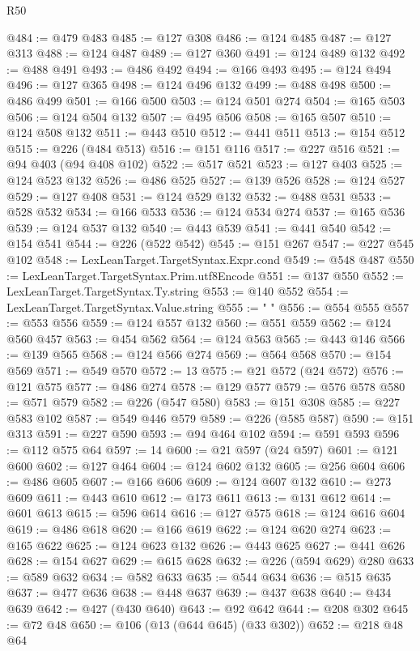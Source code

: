 \begin{lexlean}{R50}
\begin{coremodule}
{{{{{{{{{{{{{{{{{{{{{{{{{{{{{{{{{{{{{{{{{{{{{{{{{{{{{{{{{{{{@484 := @479 @483
@485 := @127 @308
@486 := @124 @485
@487 := @127 @313
@488 := @124 @487
@489 := @127 @360
@491 := @124 @489 @132
@492 := @488 @491
@493 := @486 @492
@494 := @166 @493
@495 := @124 @494
@496 := @127 @365
@498 := @124 @496 @132
@499 := @488 @498
@500 := @486 @499
@501 := @166 @500
@503 := @124 @501 @274
@504 := @165 @503
@506 := @124 @504 @132
@507 := @495 @506
@508 := @165 @507
@510 := @124 @508 @132
@511 := @443 @510
@512 := @441 @511
@513 := @154 @512
@515 := @226 (@484 @513)
@516 := @151 @116
@517 := @227 @516
@521 := @94 @403 (@94 @408 @102)
@522 := @517 @521
@523 := @127 @403
@525 := @124 @523 @132
@526 := @486 @525
@527 := @139 @526
@528 := @124 @527
@529 := @127 @408
@531 := @124 @529 @132
@532 := @488 @531
@533 := @528 @532
@534 := @166 @533
@536 := @124 @534 @274
@537 := @165 @536
@539 := @124 @537 @132
@540 := @443 @539
@541 := @441 @540
@542 := @154 @541
@544 := @226 (@522 @542)
@545 := @151 @267
@547 := @227 @545 @102
@548 := LexLeanTarget.TargetSyntax.Expr.cond
@549 := @548 @487
@550 := LexLeanTarget.TargetSyntax.Prim.utf8Encode
@551 := @137 @550
@552 := LexLeanTarget.TargetSyntax.Ty.string
@553 := @140 @552
@554 := LexLeanTarget.TargetSyntax.Value.string
@555 := " "
@556 := @554 @555
@557 := @553 @556
@559 := @124 @557 @132
@560 := @551 @559
@562 := @124 @560 @457
@563 := @454 @562
@564 := @124 @563
@565 := @443 @146
@566 := @139 @565
@568 := @124 @566 @274
@569 := @564 @568
@570 := @154 @569
@571 := @549 @570
@572 := 13
@575 := @21 @572 (@24 @572)
@576 := @121 @575
@577 := @486 @274
@578 := @129 @577
@579 := @576 @578
@580 := @571 @579
@582 := @226 (@547 @580)
@583 := @151 @308
@585 := @227 @583 @102
@587 := @549 @446 @579
@589 := @226 (@585 @587)
@590 := @151 @313
@591 := @227 @590
@593 := @94 @464 @102
@594 := @591 @593
@596 := @112 @575 @64
@597 := 14
@600 := @21 @597 (@24 @597)
@601 := @121 @600
@602 := @127 @464
@604 := @124 @602 @132
@605 := @256 @604
@606 := @486 @605
@607 := @166 @606
@609 := @124 @607 @132
@610 := @273 @609
@611 := @443 @610
@612 := @173 @611
@613 := @131 @612
@614 := @601 @613
@615 := @596 @614
@616 := @127 @575
@618 := @124 @616 @604
@619 := @486 @618
@620 := @166 @619
@622 := @124 @620 @274
@623 := @165 @622
@625 := @124 @623 @132
@626 := @443 @625
@627 := @441 @626
@628 := @154 @627
@629 := @615 @628
@632 := @226 (@594 @629) @280
@633 := @589 @632
@634 := @582 @633
@635 := @544 @634
@636 := @515 @635
@637 := @477 @636
@638 := @448 @637
@639 := @437 @638
@640 := @434 @639
@642 := @427 (@430 @640)
@643 := @92 @642
@644 := @208 @302
@645 := @72 @48
@650 := @106 (@13 (@644 @645) (@33 @302))
@652 := @218 @48 @64
}}}}}}}}}}}}}}}}}}}}}}}}}}}}}}}}}}}}}}}}}}}}}}}}}}}}}}}}}}}}
\end{coremodule}
\end{lexlean}
